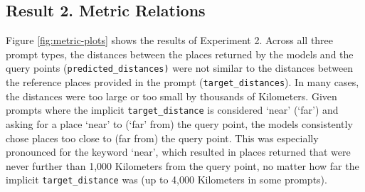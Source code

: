 \subsection{Result 2. Metric Relations}

Figure \ref{fig:metric-plots} shows the results of Experiment 2.
Across all three prompt types, the distances between the places returned by the models and the query points (\texttt{predicted{\_}distances)} were not similar to the distances between the reference places provided in the prompt (\texttt{target{\_}distances}).
In many cases, the distances were too large or too small by thousands of Kilometers.
%
Given prompts where the implicit \texttt{target{\_}distance} is considered `near' (`far') and asking for a place `near' to (`far' from) the query point, the models consistently chose places too close to (far from) the query point.
This was especially pronounced for the keyword `near', which resulted in places returned that were never further than 1,000 Kilometers from the query point, no matter how far the implicit \texttt{target{\_}distance} was (up to 4,000 Kilometers in some prompts).



\begin{figure*}[h]
    \centering
    \hfill
    \hfill
    \caption{Results of three metric relation prompts: `far', neutral, and `near'. Target distance represents the distance between `A' and `B' in Prompts 3-5, and predicted distance represents the distance between `C' and the place returned by the model. Points closer to the line drawn at $y = x$ represent more accurate metric spatial reasoning than points further from that line.}
    \label{fig:metric-plots}
\end{figure*}


